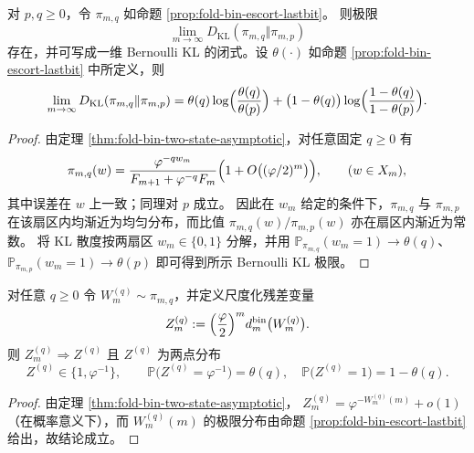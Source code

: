 \begin{proposition}\label{prop:fold-bin-escort-escort-kl}
对 \(p,q\ge 0\)，令 \(\pi_{m,q}\) 如命题 \ref{prop:fold-bin-escort-lastbit}。
则极限
\[
\lim_{m\to\infty}D_{\mathrm{KL}}(\pi_{m,q}\Vert \pi_{m,p})
\]
存在，并可写成一维 Bernoulli KL 的闭式。设 \(\theta(\cdot)\) 如命题 \ref{prop:fold-bin-escort-lastbit} 中所定义，则
\[
\lim_{m\to\infty}D_{\mathrm{KL}}(\pi_{m,q}\Vert \pi_{m,p})
=\theta(q)\log\Bigl(\frac{\theta(q)}{\theta(p)}\Bigr)+\bigl(1-\theta(q)\bigr)\log\Bigl(\frac{1-\theta(q)}{1-\theta(p)}\Bigr).
\]
\end{proposition}

\begin{proof}
由定理 \ref{thm:fold-bin-two-state-asymptotic}，对任意固定 \(q\ge 0\) 有
\[
\pi_{m,q}(w)=\frac{\varphi^{-qw_m}}{F_{m+1}+\varphi^{-q}F_m}\Bigl(1+O\bigl((\varphi/2)^m\bigr)\Bigr),
\qquad (w\in X_m),
\]
其中误差在 \(w\) 上一致；同理对 \(p\) 成立。
因此在 \(w_m\) 给定的条件下，\(\pi_{m,q}\) 与 \(\pi_{m,p}\) 在该扇区内均渐近为均匀分布，而比值 \(\pi_{m,q}(w)/\pi_{m,p}(w)\) 亦在扇区内渐近为常数。
将 KL 散度按两扇区 \(w_m\in\{0,1\}\) 分解，并用
\(\mathbb{P}_{\pi_{m,q}}(w_m=1)\to \theta(q)\)、\(\mathbb{P}_{\pi_{m,p}}(w_m=1)\to \theta(p)\)
即可得到所示 Bernoulli KL 极限。
\end{proof}

\begin{corollary}\label{cor:fold-bin-escort-two-scale-residual}
对任意 \(q\ge 0\) 令 \(W^{(q)}_m\sim\pi_{m,q}\)，并定义尺度化残差变量
\[
Z^{(q)}_m:=\Bigl(\frac{\varphi}{2}\Bigr)^m d^{\mathrm{bin}}_m\bigl(W^{(q)}_m\bigr).
\]
则 \(Z^{(q)}_m\Rightarrow Z^{(q)}\) 且 \(Z^{(q)}\) 为两点分布
\[
Z^{(q)}\in\{1,\varphi^{-1}\},
\qquad
\mathbb{P}\bigl(Z^{(q)}=\varphi^{-1}\bigr)=\theta(q),
\quad
\mathbb{P}\bigl(Z^{(q)}=1\bigr)=1-\theta(q).
\]
\end{corollary}

\begin{proof}
由定理 \ref{thm:fold-bin-two-state-asymptotic}，
\(
Z^{(q)}_m=\varphi^{-W^{(q)}_m(m)}+o(1)
\)
（在概率意义下），而 \(W^{(q)}_m(m)\) 的极限分布由命题 \ref{prop:fold-bin-escort-lastbit} 给出，故结论成立。
\end{proof}




